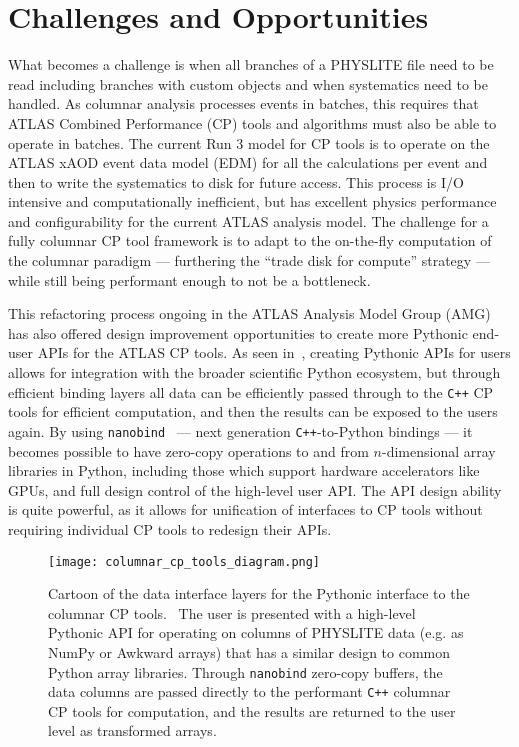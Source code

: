 \section{Challenges and Opportunities}\label{sec:challenges}

What becomes a challenge is when all branches of a PHYSLITE file need to be read including branches with custom objects and when systematics need to be handled.
As columnar analysis processes events in batches, this requires that ATLAS Combined Performance (CP) tools and algorithms must also be able to operate in batches.
The current Run 3 model for CP tools is to operate on the ATLAS xAOD event data model (EDM) for all the calculations per event and then to write the systematics to disk for future access.
This process is I/O intensive and computationally inefficient, but has excellent physics performance and configurability for the current ATLAS analysis model.
The challenge for a fully columnar CP tool framework is to adapt to the on-the-fly computation of the columnar paradigm --- furthering the ``trade disk for compute'' strategy --- while still being performant enough to not be a bottleneck.

This refactoring process ongoing in the ATLAS Analysis Model Group (AMG) has also offered design improvement opportunities to create more Pythonic end-user APIs for the ATLAS CP tools.
As seen in~, creating Pythonic APIs for users allows for integration with the broader scientific Python ecosystem, but through efficient binding layers all data can be efficiently passed through to the \texttt{C++} CP tools for efficient computation, and then the results can be exposed to the users again.
By using \texttt{nanobind}~\cite{nanobind} --- next generation \texttt{C++}-to-Python bindings --- it becomes possible to have zero-copy operations to and from $n$-dimensional array libraries in Python, including those which support hardware accelerators like GPUs, and full design control of the high-level user API.
The API design ability is quite powerful, as it allows for unification of interfaces to CP tools without requiring individual CP tools to redesign their APIs.

\begin{figure}
    \centering
    \texttt{[image: columnar\_cp\_tools\_diagram.png]}
    \caption{Cartoon of the data interface layers for the Pythonic interface to the columnar CP tools.~\cite{Vigl:ACAT_2024}
The user is presented with a high-level Pythonic API for operating on columns of PHYSLITE data (e.g. as NumPy or Awkward arrays) that has a similar design to common Python array libraries.
Through \texttt{nanobind} zero-copy buffers, the data columns are passed directly to the performant \texttt{C++} columnar CP tools for computation, and the results are returned to the user level as transformed arrays.}
    \label{fig:columnar_cp_tools_diagram}
\end{figure}
